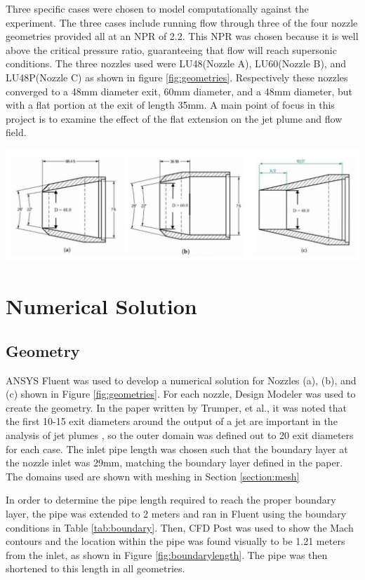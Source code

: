 \documentclass[12pt]{article} %
\begin{document}
Three specific cases were chosen to model computationally against the experiment. The three cases include running flow through three of the four nozzle geometries provided all at an NPR of 2.2. This NPR was chosen because it is well above the critical pressure ratio, guaranteeing that flow will reach supersonic conditions. The three nozzles used were LU48(Nozzle A), LU60(Nozzle B), and LU48P(Nozzle C) as shown in figure \ref{fig:geometries}. Respectively these nozzles converged to a 48mm diameter exit, 60mm diameter, and a 48mm diameter, but with a flat portion at the exit of length 35mm. A main point of focus in this project is to examine the effect of the flat extension on the jet plume and flow field. 

\begin{center}
    \includegraphics[width = \linewidth]{Geometries.png}
    \label{fig:geometries}
\end{center}

\section{Numerical Solution}
\subsection{Geometry}
ANSYS Fluent was used to develop a numerical solution for Nozzles (a), (b), and (c) shown in Figure \ref{fig:geometries}. For each nozzle, Design Modeler was used to create the geometry. In the paper written by Trumper, et al., it was noted that the first 10-15 exit diameters around the output of a jet are important in the analysis of jet plumes \cite{MilesT.Trumper2018IoNE}, so the outer domain was defined out to 20 exit diameters for each case. The inlet pipe length was chosen such that the boundary layer at the nozzle inlet was 29mm, matching the boundary layer defined in the paper. The domains used are shown with meshing in Section \ref{section:mesh}\par

In order to determine the pipe length required to reach the proper boundary layer, the pipe was extended to 2 meters and ran in Fluent using the boundary conditions in Table \ref{tab:boundary}. Then, CFD Post was used to show the Mach contours and the location within the pipe was found visually to be 1.21 meters from the inlet, as shown in Figure \ref{fig:boundarylength}. The pipe was then shortened to this length in all geometries.
\end{document}
